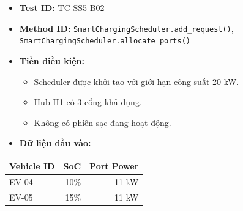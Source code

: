 \documentclass[11pt,a4paper]{article}
\providecommand{\tightlist}{%
  \setlength{\itemsep}{0pt}\setlength{\parskip}{0pt}}
\begin{document}
\begin{itemize}
\tightlist
\item
  \textbf{Test ID:} TC-SS5-B02
\item
  \textbf{Method ID:} \texttt{SmartChargingScheduler.add\_request()},
  \texttt{SmartChargingScheduler.allocate\_ports()}
\item
  \textbf{Tiền điều kiện:}

  \begin{itemize}
  \tightlist
  \item
    Scheduler được khởi tạo với giới hạn công suất 20 kW.
  \item
    Hub H1 có 3 cổng khả dụng.
  \item
    Không có phiên sạc đang hoạt động.
  \end{itemize}
\item
  \textbf{Dữ liệu đầu vào:}
\end{itemize}

\begin{longtable}[]{@{}lrr@{}}
\toprule\noalign{}
Vehicle ID & SoC & Port Power \\
\midrule\noalign{}
\endhead
\bottomrule\noalign{}
\endlastfoot
EV-04 & 10\% & 11 kW \\
EV-05 & 15\% & 11 kW \\
\end{longtable}
\end{document}
